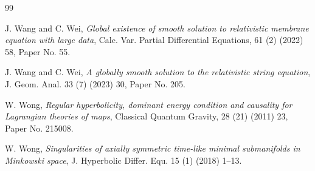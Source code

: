 \documentclass[10pt,leqno]{amsart}
\numberwithin{equation}{section}
\begin{document}
\begin{thebibliography}{99}
  
J. Wang and C. Wei,
 \textit{Global existence of smooth solution to relativistic
 	membrane equation with large data}, Calc. Var. Partial Differential Equations, 61 (2) (2022) 58, Paper No. 55.
 	
 	J. Wang and C. Wei,
 	\textit{A globally smooth solution to the relativistic string
 		equation}, J. Geom. Anal. 33 (7) (2023) 30, Paper No. 205.
 
 
 W. Wong,
 \textit{Regular hyperbolicity, dominant energy condition and causality
 	for Lagrangian theories of maps}, Classical Quantum Gravity, 28 (21) (2011) 23, Paper No. 215008.
 
 
W. Wong,
\textit{Singularities of axially symmetric time-like minimal submanifolds in Minkowski space}, J. Hyperbolic Differ. Equ. 15 (1) (2018) 1–13.
  
  
  

\end{thebibliography}
\end{document}
